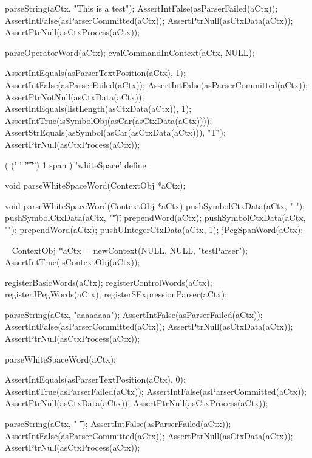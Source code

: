 \startCTest
  parseString(aCtx, "This is a test");
  AssertIntFalse(asParserFailed(aCtx));
  AssertIntFalse(asParserCommitted(aCtx));
  AssertPtrNull(asCtxData(aCtx));
  AssertPtrNull(asCtxProcess(aCtx));
  
  parseOperatorWord(aCtx);
  evalCommandInContext(aCtx, NULL);
  
  AssertIntEquals(asParserTextPosition(aCtx), 1);
  AssertIntFalse(asParserFailed(aCtx));
  AssertIntFalse(asParserCommitted(aCtx));
  AssertPtrNotNull(asCtxData(aCtx));
  AssertIntEquals(listLength(asCtxData(aCtx)), 1);
  AssertIntTrue(isSymbolObj(asCar(asCtxData(aCtx))));
  AssertStrEquals(asSymbol(asCar(asCtxData(aCtx))), "T");
  AssertPtrNull(asCtxProcess(aCtx));
\stopCTest
\stopTestCase
\stopTestSuite

\startTestSuite[parseWhiteSpaceWord]

\starttyping
(
  (' ' '\t' '\n') 1 span
) 'whiteSpace' define
\stoptyping

\startCHeader
void parseWhiteSpaceWord(ContextObj *aCtx);
\stopCHeader

\startCCode
void parseWhiteSpaceWord(ContextObj *aCtx) {
  pushSymbolCtxData(aCtx, " ");
  pushSymbolCtxData(aCtx, "\t");
  prependWord(aCtx);
  pushSymbolCtxData(aCtx, "\n");
  prependWord(aCtx);
  pushUIntegerCtxData(aCtx, 1);
  jPegSpanWord(aCtx);
}
\stopCCode

\CTestsSuiteSetup\
\startCTest
  ContextObj *aCtx = newContext(NULL, NULL, "testParser");
  AssertIntTrue(isContextObj(aCtx));
  
  registerBasicWords(aCtx);
  registerControlWords(aCtx);
  registerJPegWords(aCtx);
  registerSExpressionParser(aCtx);
\stopCTest

\startCTest
  parseString(aCtx, "aaaaaaaa");
  AssertIntFalse(asParserFailed(aCtx));
  AssertIntFalse(asParserCommitted(aCtx));
  AssertPtrNull(asCtxData(aCtx));
  AssertPtrNull(asCtxProcess(aCtx));
  
  parseWhiteSpaceWord(aCtx);
  
  AssertIntEquals(asParserTextPosition(aCtx), 0);
  AssertIntTrue(asParserFailed(aCtx));
  AssertIntFalse(asParserCommitted(aCtx));
  AssertPtrNull(asCtxData(aCtx));
  AssertPtrNull(asCtxProcess(aCtx));
\stopCTest
\stopTestCase

\startCTest
  parseString(aCtx, " \t\naaa");
  AssertIntFalse(asParserFailed(aCtx));
  AssertIntFalse(asParserCommitted(aCtx));
  AssertPtrNull(asCtxData(aCtx));
  AssertPtrNull(asCtxProcess(aCtx));
  
